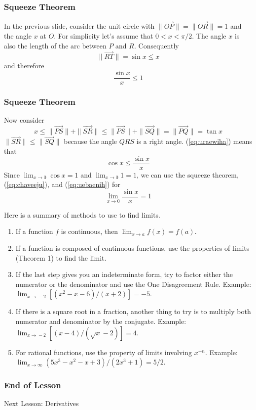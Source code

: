 \documentclass[xcolor=dvipsnames]{beamer}
\begin{document}
\begin{frame}
  \frametitle{Squeeze Theorem}
  In the previous slide, consider the unit circle with
  $\|\vec{OP}\|=\|\vec{OR}\|=1$ and the angle $x$ at $O$. For simplicity let's
  assume that $0<x<\pi/2$. The angle $x$ is also the length of the arc
  between $P$ and $R$. Consequently
  \begin{equation}
    \label{eq:iufoobue}
\|\vec{RT}\|=\sin{}x\leq{}x    
  \end{equation}
  and therefore
  \begin{equation}
    \label{eq:chaveeju}
    \frac{\sin{}x}{x}\leq{}1
  \end{equation}
\end{frame}

\begin{frame}
  \frametitle{Squeeze Theorem}
  Now consider
  \begin{equation}
    \label{eq:uraewiha}
    x\leq\|\vec{PS}\|+\|\vec{SR}\|\leq\|\vec{PS}\|+\|\vec{SQ}\|=\|\vec{PQ}\|=\tan{}x
  \end{equation}
$\|\vec{SR}\|\leq\|\vec{SQ}\|$ because the angle $QRS$ is a right angle.
(\ref{eq:uraewiha}) means that
\begin{equation}
  \label{eq:uebaenih}
  \cos{}x\leq\frac{\sin{}x}{x}
\end{equation}
Since $\lim_{x\rightarrow{}0}\cos{}x=1$ and $\lim_{x\rightarrow{}0}1=1$, we can use the squeeze
theorem, (\ref{eq:chaveeju}), and (\ref{eq:uebaenih}) for
\begin{equation}
  \label{eq:guabighe}
  \lim_{x\rightarrow{}0}\frac{\sin{}x}{x}=1
\end{equation}
\end{frame}

\begin{frame}
Here is a summary of methods to use to find limits.
\begin{enumerate}
\item If a function $f$ is continuous, then
  $\lim_{x\rightarrow{}a}f(x)=f(a)$.
\item If a function is composed of continuous functions, use the
  properties of limits (Theorem 1) to find the limit.
\item If the last step gives you an indeterminate form, try to factor
  either the numerator or the denominator and use the One Disagreement
  Rule. Example: $\lim_{x\rightarrow{}-2}[(x^{2}-x-6)/(x+2)]=-5$.
\item If there is a square root in a fraction, another thing to try is
  to multiply both numerator and denominator by the conjugate.
  Example: $\lim_{x\rightarrow{}-2}[(x-4)/(\sqrt{x}-2)]=4$.
\item For rational functions, use the property of limits involving
  $x^{-n}$. Example:
  $\lim_{x\rightarrow\infty}(5x^{3}-x^{2}-x+3)/(2x^{3}+1)=5/2$.
\end{enumerate}
\end{frame}

\begin{frame}
  \frametitle{End of Lesson}
Next Lesson: Derivatives
\end{frame}
\end{document}
